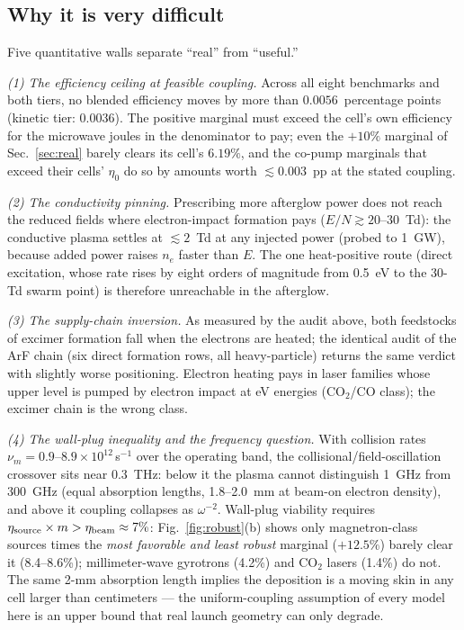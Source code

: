 \documentclass[aps,pra,preprint,longbibliography,nofootinbib]{revtex4-2}
\begin{document}
\subsection{Why it is very difficult}
\label{sec:difficult}

Five quantitative walls separate ``real'' from ``useful.''

\emph{(1) The efficiency ceiling at feasible coupling.} Across all
eight benchmarks and both tiers, no blended efficiency moves by more
than $0.0056$~percentage points (kinetic tier: $0.0036$). The positive
marginal must exceed the cell's own efficiency for the microwave joules
in the denominator to pay; even the $+10\%$ marginal of
Sec.~\ref{sec:real} barely clears its cell's $6.19\%$, and the co-pump
marginals that exceed their cells' $\eta_0$ do so by amounts worth
${\lesssim}0.003$~pp at the stated coupling.

\emph{(2) The conductivity pinning.} Prescribing more afterglow power
does not reach the reduced fields where electron-impact formation
pays ($E/N\gtrsim20$--30~Td): the conductive plasma settles at
${\lesssim}2$~Td at any injected power (probed to 1~GW), because added
power raises $n_e$ faster than $E$. The one heat-positive route
(direct excitation, whose rate rises by eight orders of magnitude from
0.5~eV to the 30-Td swarm point) is therefore unreachable in the
afterglow.

\emph{(3) The supply-chain inversion.} As measured by the audit above,
both feedstocks of excimer formation fall when the electrons are
heated; the identical audit of the ArF chain (six direct formation
rows, all heavy-particle) returns the same verdict with slightly worse
positioning. Electron heating pays in laser families whose upper level
is pumped by electron impact at eV energies (CO$_2$/CO class); the
excimer chain is the wrong class.

\emph{(4) The wall-plug inequality and the frequency question.} With
collision rates $\nu_m=0.9$--$8.9\times10^{12}\,$s$^{-1}$ over the
operating band, the collisional/field-oscillation crossover sits near
0.3~THz: below it the plasma cannot distinguish 1~GHz from 300~GHz
(equal absorption lengths, 1.8--2.0~mm at beam-on electron density),
and above it coupling collapses as $\omega^{-2}$. Wall-plug viability
requires $\eta_{\rm source}\times m > \eta_{\rm beam}\approx7\%$:
Fig.~\ref{fig:robust}(b) shows only magnetron-class sources times the
\emph{most favorable and least robust} marginal ($+12.5\%$) barely
clear it (8.4--8.6\%); millimeter-wave gyrotrons (4.2\%) and CO$_2$
lasers (1.4\%) do not. The same 2-mm absorption length implies the
deposition is a moving skin in any cell larger than centimeters ---
the uniform-coupling assumption of every model here is an upper bound
that real launch geometry can only degrade.
\end{document}
